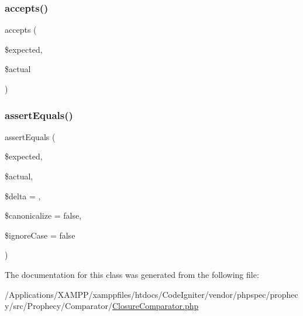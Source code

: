 \subsubsection{\texorpdfstring{accepts()}{accepts()}}
{\footnotesize\ttfamily accepts (\begin{DoxyParamCaption}\item[{}]{\$expected,  }\item[{}]{\$actual }\end{DoxyParamCaption})}

\mbox{\label{class_prophecy_1_1_comparator_1_1_closure_comparator_adb3679ea06503114394431cb250ec5a4}} 
\subsubsection{\texorpdfstring{assert\+Equals()}{assertEquals()}}
{\footnotesize\ttfamily assert\+Equals (\begin{DoxyParamCaption}\item[{}]{\$expected,  }\item[{}]{\$actual,  }\item[{}]{\$delta = {},  }\item[{}]{\$canonicalize = {\ttfamily false},  }\item[{}]{\$ignore\+Case = {\ttfamily false} }\end{DoxyParamCaption})}



The documentation for this class was generated from the following file\+:\begin{DoxyCompactItemize}
\item 
/\+Applications/\+X\+A\+M\+P\+P/xamppfiles/htdocs/\+Code\+Igniter/vendor/phpspec/prophecy/src/\+Prophecy/\+Comparator/\mbox{\hyperlink{_closure_comparator_8php}{Closure\+Comparator.\+php}}\end{DoxyCompactItemize}
